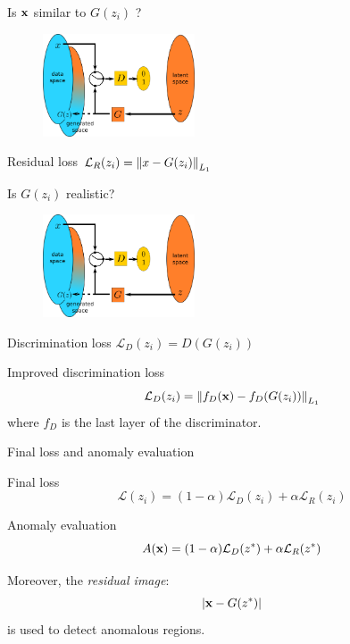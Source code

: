 \documentclass[xcolor=pdftex,dvipsnames,table,mathserif]{beamer}
\begin{document}
\begin{frame}{Is $\mathbf{x}$ similar to $G(z_i)$ ?}

  \begin{figure}[ht]
    \centering
    \includegraphics[width=0.4\textwidth]{gan2}
  \end{figure}

  \begin{block}{Residual loss}
    \centering
    $\mathcal{L}_R(z_i) = \norm{x - G(z_i)}_{L_1}$
  \end{block}

\end{frame}


\begin{frame}{Is $G(z_i)$ realistic?}

  \begin{figure}[ht]
    \centering
    \includegraphics[width=0.4\textwidth]{gan2}
  \end{figure}

  \begin{block}{Discrimination loss}
    \centering
    $\mathcal{L}_D(z_i) = D(G(z_i))$
  \end{block}

  \begin{block}{Improved discrimination loss}
    \[\mathcal{L}_D(z_i) = \norm{f_D(\mathbf{x}) - f_D(G(z_i))}_{L_1}\]
    where $f_D$ is the last layer of the discriminator.
  \end{block}


\end{frame}


\begin{frame}{Final loss and anomaly evaluation}

  \begin{block}{Final loss}
    \[\mathcal{L}(z_i) = (1-\alpha)\mathcal{L}_D(z_i) + \alpha \mathcal{L}_R(z_i) \]
  \end{block}

  \begin{block}{Anomaly evaluation}
    \[A(\mathbf{x}) = (1-\alpha)\mathcal{L}_D(z^*) + \alpha \mathcal{L}_R(z^*) \]

      Moreover, the \emph{residual image}:
      \[
      |\mathbf{x} - G(z^*)|
      \]
      is used to detect anomalous regions.
  \end{block}

\end{frame}
\end{document}
